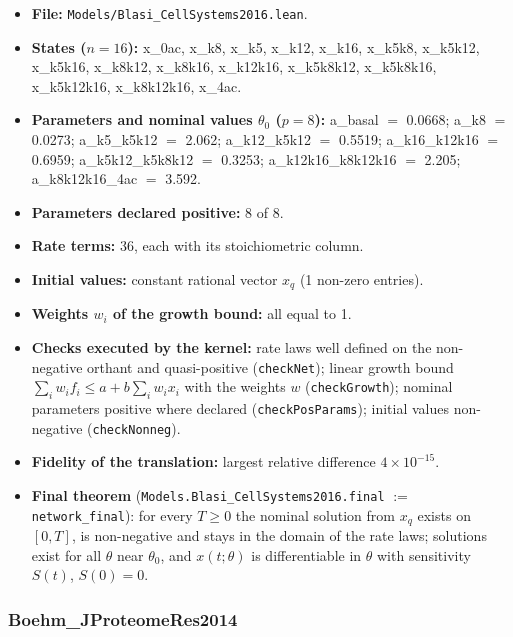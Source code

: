 \begin{itemize}\itemsep0pt\small
\item \textbf{File:} \texttt{Models/Blasi\_CellSystems2016.lean}.
\item \textbf{States ($n=16$):} x\_0ac, x\_k8, x\_k5, x\_k12, x\_k16, x\_k5k8, x\_k5k12, x\_k5k16, x\_k8k12, x\_k8k16, x\_k12k16, x\_k5k8k12, x\_k5k8k16, x\_k5k12k16, x\_k8k12k16, x\_4ac.
\item \textbf{Parameters and nominal values $\theta_0$ ($p=8$):} a\_basal $=$ 0.0668; a\_k8 $=$ 0.0273; a\_k5\_k5k12 $=$ 2.062; a\_k12\_k5k12 $=$ 0.5519; a\_k16\_k12k16 $=$ 0.6959; a\_k5k12\_k5k8k12 $=$ 0.3253; a\_k12k16\_k8k12k16 $=$ 2.205; a\_k8k12k16\_4ac $=$ 3.592.
\item \textbf{Parameters declared positive:} 8 of 8.
\item \textbf{Rate terms:} 36, each with its stoichiometric column.
\item \textbf{Initial values:} constant rational vector $x_q$ (1 non-zero entries).
\item \textbf{Weights $w_i$ of the growth bound:} all equal to 1.
\item \textbf{Checks executed by the kernel:} rate laws well defined on the non-negative orthant and quasi-positive (\texttt{checkNet}); linear growth bound $\sum_iw_if_i\le a+b\sum_iw_ix_i$ with the weights $w$ (\texttt{checkGrowth}); nominal parameters positive where declared (\texttt{checkPosParams}); initial values non-negative (\texttt{checkNonneg}).
\item \textbf{Fidelity of the translation:} largest relative difference $4\times10^{-15}$.
\item \textbf{Final theorem} (\texttt{Models.Blasi\_CellSystems2016.final} $:=$ \texttt{network\_final}): for every $T\ge0$ the nominal solution from $x_q$ exists on $[0,T]$, is non-negative and stays in the domain of the rate laws; solutions exist for all $\theta$ near $\theta_0$, and $x(t;\theta)$ is differentiable in $\theta$ with sensitivity $S(t)$, $S(0)=0$.
\end{itemize}

\subsubsection*{Boehm\_JProteomeRes2014}

